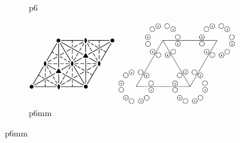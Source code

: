 \documentclass[12pt]{article}
\begin{document}
\begin{figure}
\begin{subfigure}[b]{0.45\textwidth}
        \caption*{p6}
    \end{subfigure}
    \begin{subfigure}[b]{0.45\textwidth}
        \centering
        \includegraphics[width=\textwidth]{planegroups/17.png}
        \caption*{p6mm}
    \end{subfigure}
\end{figure}
\end{document}
